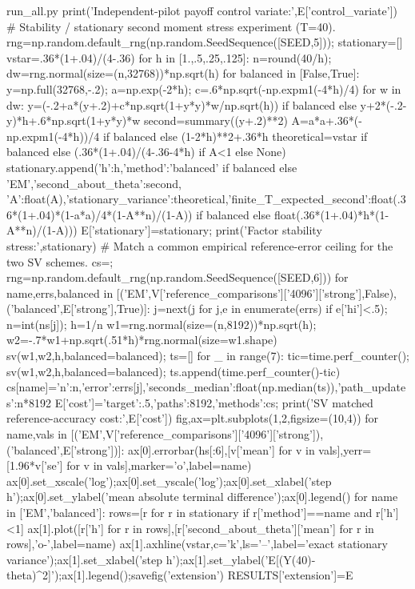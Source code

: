 \begin{filecontents*}[overwrite]{run_all.py}
print('Independent-pilot payoff control variate:',E['control_variate'])
# Stability / stationary second moment stress experiment (T=40).
rng=np.random.default_rng(np.random.SeedSequence([SEED,5])); stationary=[]
vstar=.36*(1+.04)/(4-.36)
for h in [1.,.5,.25,.125]:
 n=round(40/h); dw=rng.normal(size=(n,32768))*np.sqrt(h)
 for balanced in [False,True]:
  y=np.full(32768,-.2); a=np.exp(-2*h); c=.6*np.sqrt(-np.expm1(-4*h)/4)
  for w in dw:
   y=(-.2+a*(y+.2)+c*np.sqrt(1+y*y)*w/np.sqrt(h)) if balanced else y+2*(-.2-y)*h+.6*np.sqrt(1+y*y)*w
  second=summary((y+.2)**2)
  A=a*a+.36*(-np.expm1(-4*h))/4 if balanced else (1-2*h)**2+.36*h
  theoretical=vstar if balanced else (.36*(1+.04)/(4-.36-4*h) if A<1 else None)
  stationary.append({'h':h,'method':'balanced' if balanced else 'EM','second_about_theta':second,
   'A':float(A),'stationary_variance':theoretical,'finite_T_expected_second':float(.36*(1+.04)*(1-a*a)/4*(1-A**n)/(1-A)) if balanced else float(.36*(1+.04)*h*(1-A**n)/(1-A))})
E['stationary']=stationary; print('Factor stability stress:',stationary)
# Match a common empirical reference-error ceiling for the two SV schemes.
cs={}; rng=np.random.default_rng(np.random.SeedSequence([SEED,6]))
for name,errs,balanced in [('EM',V['reference_comparisons']['4096']['strong'],False),('balanced',E['strong'],True)]:
 j=next(j for j,e in enumerate(errs) if e['hi']<.5); n=int(ns[j]); h=1/n
 w1=rng.normal(size=(n,8192))*np.sqrt(h); w2=-.7*w1+np.sqrt(.51*h)*rng.normal(size=w1.shape)
 sv(w1,w2,h,balanced=balanced); ts=[]
 for _ in range(7):
  tic=time.perf_counter(); sv(w1,w2,h,balanced=balanced); ts.append(time.perf_counter()-tic)
 cs[name]={'n':n,'error':errs[j],'seconds_median':float(np.median(ts)),'path_updates':n*8192}
E['cost']={'target':.5,'paths':8192,'methods':cs}; print('SV matched reference-accuracy cost:',E['cost'])
fig,ax=plt.subplots(1,2,figsize=(10,4))
for name,vals in [('EM',V['reference_comparisons']['4096']['strong']),('balanced',E['strong'])]:
 ax[0].errorbar(hs[:6],[v['mean'] for v in vals],yerr=[1.96*v['se'] for v in vals],marker='o',label=name)
ax[0].set_xscale('log');ax[0].set_yscale('log');ax[0].set_xlabel('step h');ax[0].set_ylabel('mean absolute terminal difference');ax[0].legend()
for name in ['EM','balanced']:
 rows=[r for r in stationary if r['method']==name and r['h']<1]
 ax[1].plot([r['h'] for r in rows],[r['second_about_theta']['mean'] for r in rows],'o-',label=name)
ax[1].axhline(vstar,c='k',ls='--',label='exact stationary variance');ax[1].set_xlabel('step h');ax[1].set_ylabel('E[(Y(40)-theta)^2]');ax[1].legend();savefig('extension')
RESULTS['extension']=E

\end{filecontents*}
